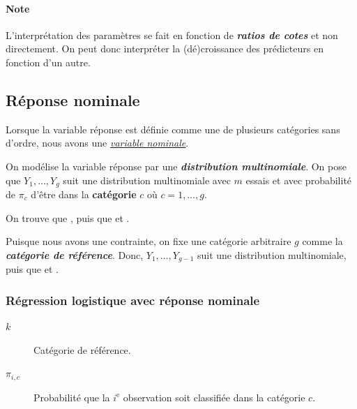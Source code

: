 \documentclass[french]{article}
\begin{document}
\begin{multicols*}{2}
\paragraph{Note}	L'interprétation des paramètres se fait en fonction de \textbf{\textit{ratios de cotes}} et non directement. On peut donc interpréter la (dé)croissance des prédicteurs en fonction d'un autre.



\columnbreak
\subsection{Réponse nominale}
\begin{rappel_enhanced}[Contexte]
Lorsque la variable réponse est définie comme une de plusieurs catégories sans d'ordre, nous avons une \textit{\color{bleudefrance}\underline{\hyperlink{nominalVariable}{\color{bleudefrance} variable nominale}}}. 
\end{rappel_enhanced}

On modélise la variable réponse par une \textbf{\textit{distribution multinomiale}}. On pose que $Y_{1}, \dots, Y_{g}$ suit une distribution multinomiale avec $m$ essais et avec probabilité de $\pi_{c}$ d'être dans la \textbf{catégorie} $c$ où $c = 1, \dots, g$. 

\bigskip

On trouve que , puis que  et .

\bigskip

Puisque nous avons une contrainte, on fixe une catégorie arbitraire $g$ comme la \textbf{\textit{catégorie de référence}}. Donc, $Y_{1}, \dots, Y_{g - 1}$ suit une distribution multinomiale, puis que  et .




\subsubsection{Régression logistique avec réponse nominale}
\begin{distributions}[Notation]
\begin{description}
	\item[$k$]	Catégorie de référence.
	\item[$\pi_{i, c}$]	Probabilité que la $i^{\text{e}}$ observation soit classifiée dans la catégorie $c$.
\end{description}
\end{distributions}


\end{multicols*}
\end{document}
